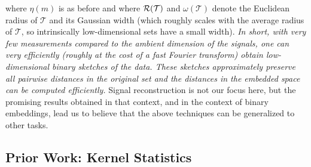 where $\eta(m)$ is as before and \fi
where $\mathcal{R}(\mathcal{T})$ and $\omega(\mathcal{T})$ denote  the Euclidean radius of  $\mathcal{T}$ and its Gaussian width (which roughly scales with the average radius of $\mathcal{T}$, so  intrinsically low-dimensional sets have a small  width). %
 \emph{In short, with \emph{very few measurements} compared to the ambient dimension of the signals, one can very efficiently (roughly at the cost of a fast Fourier transform) obtain low-dimensional binary sketches of the data. These sketches approximately preserve all pairwise distances in the original set and the distances in the embedded space can be computed efficiently.}
Signal reconstruction is not our focus here, but the promising results obtained in that context, and in the context of binary embeddings, lead us to believe that the above techniques can be generalized to other tasks. 





\subsection{Prior Work: Kernel Statistics}\label{sec:KernelBackground}

